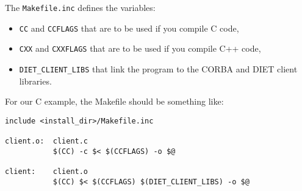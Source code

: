 The \texttt{Makefile.inc} defines the variables:
\begin{itemize}
\item \texttt{CC} and \texttt{CCFLAGS} that are to be used if you compile C
 code,
\item \texttt{CXX} and \texttt{CXXFLAGS} that are to be used if you compile C++
  code,
\item \texttt{DIET\_CLIENT\_LIBS} that link the program to the CORBA and DIET
  client libraries.
\end{itemize}

For our C example, the Makefile should be something like:
{\footnotesize
\begin{verbatim}
include <install_dir>/Makefile.inc

client.o:  client.c
           $(CC) -c $< $(CCFLAGS) -o $@

client:    client.o
           $(CC) $< $(CCFLAGS) $(DIET_CLIENT_LIBS) -o $@
\end{verbatim}
}

